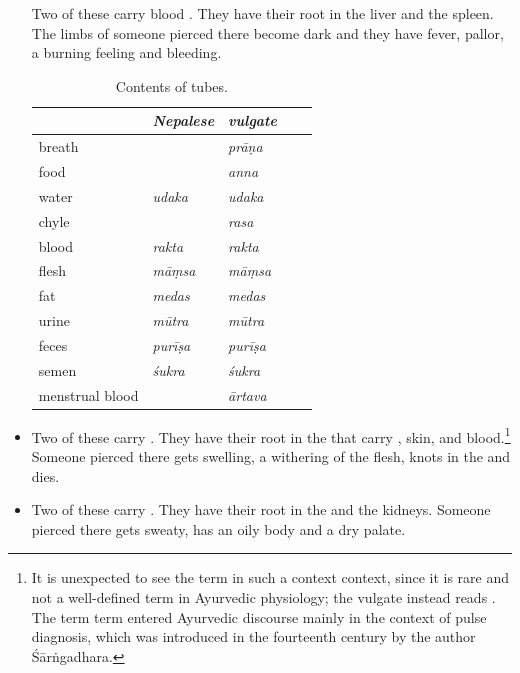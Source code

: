 \begin{translation}
\begin{itemize}
Two of these carry blood .  They have their root in the 
liver and the spleen.  The limbs of someone pierced there become dark and they 
have fever, pallor, a burning feeling and bleeding. 
\begin{table}[t]
    \centering    \footnotesize
    \begin{tabular}{l>{\it}l>{\it}lll}
        & {\rm Nepalese} & {\rm vulgate} &  &   \\
        \toprule
       breath& & prāṇa   &  &    \\
     food   & & anna    &  &    \\
    water&    udaka    & udaka    &   &  \\
  chyle&      & rasa    &  &   \\
       blood &  rakta    & rakta   &  &  \\
 flesh &       māṃsa    & māṃsa   &  &    \\
    fat &     medas    & medas   &  &   \\
  urine &         mūtra    & mūtra   &  & \\
     feces&     purīṣa   & purīṣa  &  &  \\
    semen &      śukra    & śukra   &  &  \\
    menstrual blood &     & ārtava  &  &  \\
        \bottomrule
    \end{tabular}
    \caption{Contents of tubes.}
    \label{tubecontents}
\end{table}

\item 

Two of these carry  .  They have their root in
the  that carry , skin, and
blood.\footnote{It is unexpected to see the term  in such a
    context context, since it is rare and not a well-defined term in
    Ayurvedic physiology; the vulgate instead reads .  The
    term term  entered Ayurvedic discourse mainly in the context
    of pulse diagnosis, which was introduced in the fourteenth century by
    the author Śārṅgadhara.} Someone pierced there gets swelling, a withering of 
    the flesh, knots in the  and dies.

\item 

Two of these carry  .  They have their root in the
 and the kidneys.  Someone pierced there gets
sweaty, has an oily body and a dry palate.


\end{itemize}
\end{translation}
